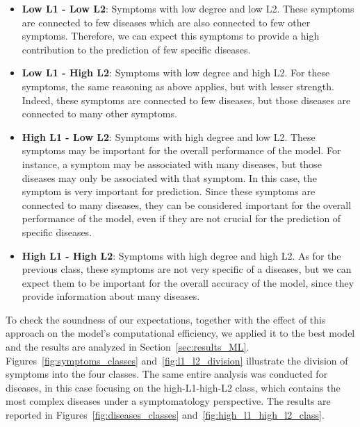 \begin{itemize}
    \setlength\itemsep{1em}
    \item \textbf{Low L1 - Low L2}: Symptoms with low degree and low L2. These symptoms are connected to few diseases
    which are also connected to few other symptoms. Therefore, we can expect this symptoms to provide a high
    contribution to the prediction of few specific diseases.

    \item \textbf{Low L1 - High L2}: Symptoms with low degree and high L2. For these symptoms, the same reasoning
    as above applies, but with lesser strength. Indeed, these symptoms are connected to few diseases, but those
    diseases are connected to many other symptoms.

    \item \textbf{High L1 - Low L2}: Symptoms with high degree and low L2. These symptoms may be important for the
    overall performance of the model. For instance, a symptom may be associated with many diseases, but those
    diseases may only be associated with that symptom. In this case, the symptom is very important for prediction.
    Since these symptoms are connected to many diseases, they can be considered important for the overall 
    performance of the model, even if they are not crucial for the prediction of specific diseases.

    \item \textbf{High L1 - High L2}: Symptoms with high degree and high L2. As for the previous class, 
    these symptoms are not very specific of a diseases, but we can expect them to be important for the overall
    accuracy of the model, since they provide information about many diseases.

\end{itemize}

\noindent
To check the soundness of our expectations, together with the effect of this approach on the model's computational
efficiency, we applied it to the best model and the results are analyzed in Section~\ref{sec:results_ML}.\\
Figures~\ref{fig:symptoms_classes} and~\ref{fig:l1_l2_division} illustrate the division of symptoms into the four classes.
The same entire analysis was conducted for diseases, in this case focusing on the high-L1-high-L2 class, which contains
the most complex diseases under a symptomatology perspective. The results are reported in Figures~\ref{fig:diseases_classes}
and~\ref{fig:high_l1_high_l2_class}.\\


